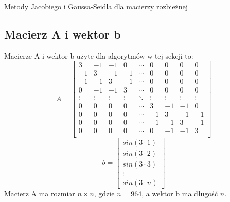 \documentclass{article}
\begin{document}
\begin{section}{Metody Jacobiego i Gaussa-Seidla dla macierzy rozbieżnej}
    \subsection{Macierz A i wektor b}
    Macierze A i wektor b użyte dla algorytmów w tej sekcji to:
    \begin{equation}
        A = \begin{bmatrix}
            3 & -1 & -1 & 0 & \cdots & 0 & 0 & 0 & 0 \\
            -1 & 3 & -1 & -1 & \cdots & 0 & 0 & 0 & 0 \\
            -1 & -1 & 3 & -1 & \cdots & 0 & 0 & 0 & 0 \\
            0 & -1 & -1 & 3 & \cdots & 0 & 0 & 0 & 0 \\
            \vdots & \vdots & \vdots & \vdots & \ddots & \vdots & \vdots & \vdots & \vdots \\
            0 & 0 & 0 & 0 & \cdots & 3 & -1 & -1 & 0 \\
            0 & 0 & 0 & 0 & \cdots & -1 & 3 & -1 & -1 \\
            0 & 0 & 0 & 0 & \cdots & -1 & -1 & 3 & -1 \\
            0 & 0 & 0 & 0 & \cdots & 0 & -1 & -1 & 3 \\
        \end{bmatrix}
    \end{equation}
    \begin{equation}
        b = \begin{bmatrix}
            sin(3 \cdot 1) \\
            sin(3 \cdot 2) \\
            sin(3 \cdot 3) \\
            \vdots \\
            sin(3 \cdot n)
        \end{bmatrix}
    \end{equation}
    Macierz A ma rozmiar $n \times n$, gdzie $n = 964$, a wektor b ma długość $n$.


\end{section}
\end{document}
